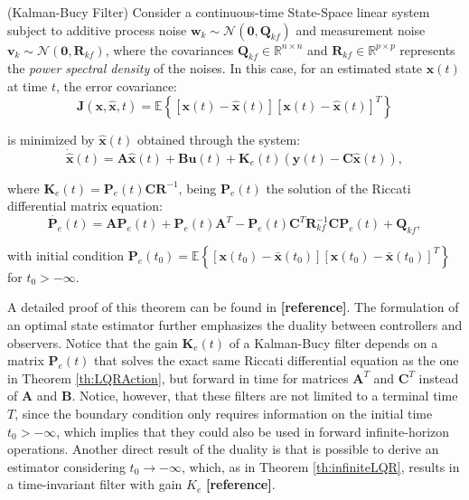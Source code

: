 \documentclass[a4paper,11pt]{book}
\numberwithin{figure}{chapter}
\numberwithin{equation}{chapter}
\numberwithin{table}{chapter}
\newtheorem{theorem}{Theorem}[chapter]
\theoremstyle{definition}
\newcounter{boxed-theorem}
\newenvironment{boxed-theorem}[1]
{\colorlet{shadecolor}{pastelBlue2!10} \begin{shaded} \begin{theorem}{#1}}
{\end{theorem} \end{shaded}}
\newcounter{boxed-definition}
\newcounter{boxed-example}
\begin{document}
\begin{boxed-theorem}{(Kalman-Bucy Filter)} \label{th:kalmanBucy}
    Consider a continuous-time State-Space linear system subject to additive process noise $\bm{w}_k \sim \mathcal{N}(\bm{0}, \bm{Q}_{kf})$ and measurement noise $\bm{v}_k \sim \mathcal{N}(\bm{0}, \bm{R}_{kf})$, where the covariances $\bm{Q}_{kf} \in \mathbb{R}^{n \times n}$  and $\bm{R}_{kf} \in \mathbb{R}^{p \times p}$ represents the \emph{power spectral density} of the noises.   In this case, for an estimated state $\hat{\bm{x}}(t)$ at time $t$, the error covariance:
    \begin{equation}
        \bm{J}(\bm{x}, \hat{\bm{x}}, t) = \mathbb{E}\left\{ [\bm{x}(t) - \hat{\bm{x}}(t)][\bm{x}(t) - \hat{\bm{x}}(t)]^T \right\}
    \end{equation}
    
    \noindent is minimized by $\hat{\bm{x}}(t)$ obtained through the system:
    \begin{equation}
        \dot{\hat{\bm{x}}}(t) = \bm{A} \hat{\bm{x}}(t) + \bm{B} \bm{u}(t) + \bm{K}_{e}(t) \left( \bm{y}(t) - \bm{C} \hat{\bm{x}}(t) \right)
    ,\end{equation}
    
    \noindent where $\bm{K}_e(t) = \bm{P}_e(t)\bm{C}\bm{R}^{-1}$, being $\bm{P}_e(t)$ the solution of the Riccati differential matrix equation:
    \begin{equation}
        \dot{\bm{P}_e}(t) = \bm{A} \bm{P}_e(t) + \bm{P}_e(t) \bm{A}^T - \bm{P}_e(t)\bm{C}^T\bm{R}_{kf}^{-1} \bm{C} \bm{P}_e(t) + \bm{Q}_{kf}
    ,\end{equation}
    
    \noindent with initial condition $\bm{P}_e(t_0) = \mathbb{E} \left\{ [\bm{x}(t_0) - \bar{\bm{x}}(t_0)][\bm{x}(t_0) - \bar{\bm{x}}(t_0)]^T \right\}$ for $t_0 > -\infty$.
\end{boxed-theorem}

A detailed proof of this theorem can be found in \textbf{[reference]}. The formulation of an optimal state estimator further emphasizes the duality between controllers and observers. Notice that the gain $\bm{K}_e(t)$ of a Kalman-Bucy filter depends on a matrix $\bm{P}_e(t)$ that solves the exact same Riccati differential equation as the one in Theorem \ref{th:LQRAction}, but forward in time for matrices $\bm{A}^T$ and $\bm{C}^T$ instead of $\bm{A}$ and $\bm{B}$. Notice, however, that these filters are not limited to a terminal time $T$, since the boundary condition only requires information on the initial time $t_0 > -\infty$, which implies that they could also be used in forward infinite-horizon operations. Another direct result of the duality is that is possible to derive an estimator considering $t_0 \to -\infty$, which, as in Theorem \ref{th:infiniteLQR}, results in a time-invariant filter with gain $K_e$ \textbf{[reference]}.
\end{document}
